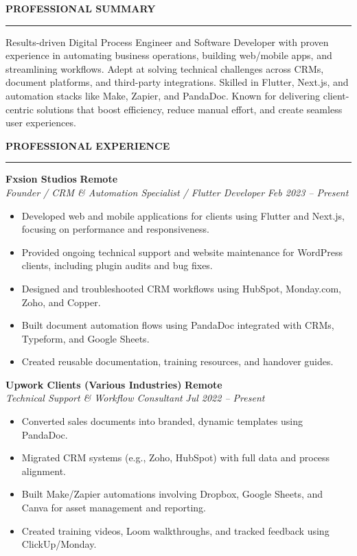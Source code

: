 \documentclass[11pt,a4paper]{article}
\newcommand{\mainsection}[1]{
    \vspace{0.3cm}
    \textbf{\textcolor{headergray}{\Large #1}}
    \vspace{0.1cm}
    
    \textcolor{mainblue}{\rule{\linewidth}{1pt}}
    \vspace{0.25cm}
}
\newcommand{\jobentry}[4]{
    \textbf{\textcolor{mainblue}{#1}} \hfill \textbf{#2}\\
    \textit{#3} \hfill \textit{#4}\\
    \vspace{0.1cm}
}
\begin{document}
\begin{minipage}[t]{0.65\textwidth}
    \vspace{0.4cm}
    \mainsection{PROFESSIONAL SUMMARY}
    
    \textcolor{textgray}{Results-driven Digital Process Engineer and Software Developer with proven experience in automating business operations, building web/mobile apps, and streamlining workflows. Adept at solving technical challenges across CRMs, document platforms, and third-party integrations. Skilled in Flutter, Next.js, and automation stacks like Make, Zapier, and PandaDoc. Known for delivering client-centric solutions that boost efficiency, reduce manual effort, and create seamless user experiences.}
    
    \mainsection{PROFESSIONAL EXPERIENCE}
    
    \jobentry{Fxsion Studios}{Remote}
    {Founder / CRM \& Automation Specialist / Flutter Developer}{Feb 2023 -- Present}
    
    \begin{itemize}[leftmargin=1.5em, itemsep=2pt, label=\textcolor{mainblue}{\footnotesize\faAngleRight}]
        \item Developed web and mobile applications for clients using Flutter and Next.js, focusing on performance and responsiveness.
        \item Provided ongoing technical support and website maintenance for WordPress clients, including plugin audits and bug fixes.
        \item Designed and troubleshooted CRM workflows using HubSpot, Monday.com, Zoho, and Copper.
        \item Built document automation flows using PandaDoc integrated with CRMs, Typeform, and Google Sheets.
        \item Created reusable documentation, training resources, and handover guides.
    \end{itemize}
    
    \vspace{0.3cm}
    \jobentry{Upwork Clients (Various Industries)}{Remote}
    {Technical Support \& Workflow Consultant}{Jul 2022 -- Present}
    
    \begin{itemize}[leftmargin=1.5em, itemsep=2pt, label=\textcolor{mainblue}{\footnotesize\faAngleRight}]
        \item Converted sales documents into branded, dynamic templates using PandaDoc.
        \item Migrated CRM systems (e.g., Zoho, HubSpot) with full data and process alignment.
        \item Built Make/Zapier automations involving Dropbox, Google Sheets, and Canva for asset management and reporting.
        \item Created training videos, Loom walkthroughs, and tracked feedback using ClickUp/Monday.
    \end{itemize}
    

\end{minipage}
\end{document}
